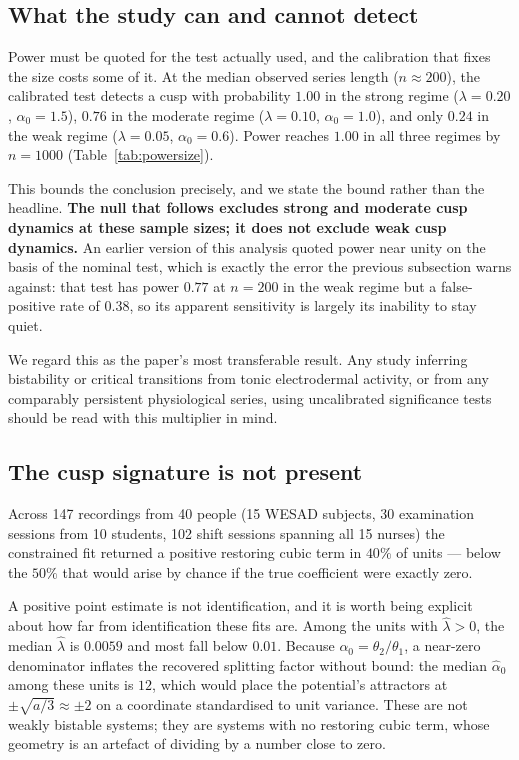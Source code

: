 \documentclass[conference]{IEEEtran}
\begin{document}
\subsection{What the study can and cannot detect}
\label{sec:power}
Power must be quoted for the test actually used, and the calibration that fixes
the size costs some of it. At the median observed series length
($n\approx200$), the calibrated test detects a cusp with probability $1.00$ in
the strong regime ($\lambda=0.20$, $\alpha_0=1.5$), $0.76$ in the moderate
regime ($\lambda=0.10$, $\alpha_0=1.0$), and only $0.24$ in the weak regime
($\lambda=0.05$, $\alpha_0=0.6$). Power reaches $1.00$ in all three regimes by
$n=1000$ (Table~\ref{tab:powersize}).

This bounds the conclusion precisely, and we state the bound rather than the
headline. \textbf{The null that follows excludes strong and moderate cusp
dynamics at these sample sizes; it does not exclude weak cusp dynamics.} An
earlier version of this analysis quoted power near unity on the basis of the
nominal test, which is exactly the error the previous subsection warns
against: that test has power $0.77$ at $n=200$ in the weak regime but a
false-positive rate of $0.38$, so its apparent sensitivity is largely its
inability to stay quiet.

We regard this as the paper's most transferable result. Any study inferring
bistability or critical transitions from tonic electrodermal activity, or from
any comparably persistent physiological series, using uncalibrated
significance tests should be read with this multiplier in mind.

\subsection{The cusp signature is not present}
Across 147 recordings from 40 people (15 WESAD subjects, 30 examination
sessions from 10 students, 102 shift sessions spanning all 15 nurses) the
constrained fit returned a positive restoring cubic term in $40\%$ of units ---
below the $50\%$ that would arise by chance if the true coefficient were
exactly zero.

A positive point estimate is not identification, and it is worth being explicit
about how far from identification these fits are. Among the units with
$\hat\lambda>0$, the median $\hat\lambda$ is $0.0059$ and most fall below
$0.01$. Because $\alpha_0=\theta_2/\theta_1$, a near-zero denominator inflates
the recovered splitting factor without bound: the median $\hat\alpha_0$ among
these units is $12$, which would place the potential's attractors at
$\pm\sqrt{a/3}\approx\pm2$ on a coordinate standardised to unit variance. These
are not weakly bistable systems; they are systems with no restoring cubic term,
whose geometry is an artefact of dividing by a number close to zero.
\end{document}
